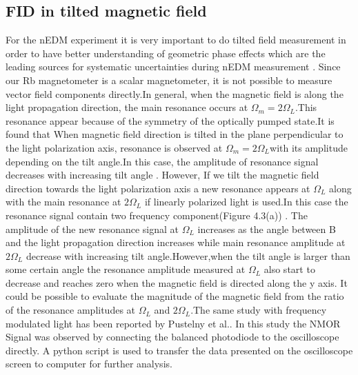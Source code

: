 \documentclass[12pt]{report}
\begin{document}
\subsection{FID in tilted magnetic field}
For the nEDM experiment it is very important to do tilted field measurement in order to have better understanding of  geometric phase effects which are the leading sources for systematic uncertainties during nEDM measurement . 
Since our Rb magnetometer is a scalar magnetometer, it is not possible to measure vector field components directly.In general, when the magnetic field is along the light propagation direction, the main resonance occurs at $\Omega_m = 2\Omega_L$.This resonance appear because of the symmetry of the optically pumped state.It is found that When magnetic field direction is tilted in the plane perpendicular to the light polarization axis, resonance is observed at  $\Omega_m = 2\Omega_L$with its amplitude depending on the tilt angle.In this case, the amplitude of resonance signal decreases with increasing tilt angle . However, If we tilt the magnetic field direction towards the light polarization axis a new resonance appears at $\Omega_L$ along with the main resonance at $2\Omega_L$ if linearly polarized light is used.In this case the resonance signal contain two frequency component(Figure 4.3(a)) . The amplitude of the new resonance signal at $\Omega_L$  increases as the angle between B and the light propagation direction increases while main resonance amplitude at $2\Omega_L$  decrease with increasing tilt angle.However,when the tilt angle is larger than some certain angle the resonance amplitude measured at $\Omega_L$ also start to decrease and reaches zero when the magnetic field is directed along the y axis.   It could be possible to evaluate the magnitude of the magnetic field from the ratio of the resonance amplitudes at $\Omega_L$ and $2\Omega_L$.The same study with frequency modulated light has been reported by Pustelny et al.\cite{PhysRevA.74.063420}. In this study the NMOR Signal was observed by connecting the balanced photodiode to the oscilloscope directly. A python script is used to transfer the data presented on the oscilloscope screen to computer for further analysis. 
\end{document}
